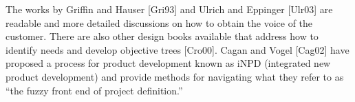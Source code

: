 The works by Griffin and Hauser {[}Gri93{]} and Ulrich and Eppinger
{[}Ulr03{]} are readable and more detailed discussions on how to obtain
the voice of the customer. There are also other design books available
that address how to identify needs and develop objective trees
{[}Cro00{]}. Cagan and Vogel {[}Cag02{]} have proposed a process for
product development known as iNPD (integrated new product development)
and provide methods for navigating what they refer to as ``the fuzzy
front end of project definition.''
